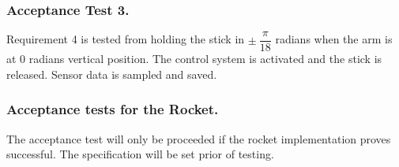 \subsubsection*{Acceptance Test 3.}
\forceindent Requirement 4 is tested from holding the stick in $\pm\ \dfrac{\pi}{18}$ radians when the arm is at 0 radians vertical position. The control system is activated and the stick is released. Sensor data is sampled and saved.

\subsubsection*{Acceptance tests for the Rocket.}
\forceindent The acceptance test will only be proceeded if the rocket implementation proves successful. The specification will be set prior of testing.  